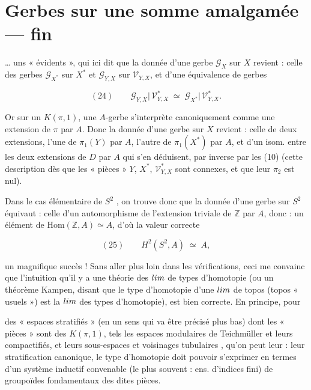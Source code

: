 \documentclass[11pt,a4paper]{article}
\begin{document}
\section*{Gerbes sur une somme amalgamée — fin}

… uns « évidents », qui ici dit que la donnée d'une gerbe $\mathcal{G}_X$
sur $X$ revient : celle des gerbes $\mathcal{G}_{X^{*}}$ sur $X^{*}$ et
$\mathcal{G}_{Y,X}$ sur $\mathcal{V}_{Y,X}$, et d'une 
équivalence de  gerbes

\[
  (24) \qquad
  \mathcal{G}_{Y,X}\bigl|\,\mathcal{V}^{*}_{Y,X}
  \;\simeq\;
  \mathcal{G}_{X^{*}}\bigl|\,\mathcal{V}^{*}_{Y,X} .
\]

Or sur un $K(\pi,1)$, une $A$-gerbe s'interprète canoniquement comme une
extension de $\pi$ par $A$. Donc la donnée d'une gerbe sur $X$
 revient : celle  de deux extensions, l'une de
$\pi_1(Y)$ par $A$, l'autre de $\pi_1(X^{*})$ par $A$, et d'un isom. entre les
deux extensions de $D$ par $A$ qui s'en déduisent, par  inverse par les  (10)
(cette description  dès que les « pièces » $Y$, $X^{*}$, $\mathcal{V}^{*}_{Y,X}$ sont
connexes, et que leur $\pi_2$ est nul).


Dans le cas élémentaire de $S^{2}$ , on trouve donc que la donnée
d'une gerbe sur $S^{2}$ équivaut : celle d'un automorphisme de l'extension
triviale de $\mathbb{Z}$ par $A$, donc : un élément de
$\mathrm{Hom}(\mathbb{Z}, A) \simeq A$, d'où la valeur correcte

\[
  (25) \qquad H^{2}(S^{2}, A) \;\simeq\; A ,
\]

un magnifique succès ! Sans aller plus loin dans  les
vérifications, ceci me convainc que l'intuition qu'il y a une théorie des
 $\varinjlim$ de types d'homotopie (ou un
théorème  Kampen, disant que le type d'homotopie d'une
$\varinjlim$ de topos (topos « usuels ») est la $\varinjlim$ des types
d'homotopie), est bien correcte. En principe, pour

des « espaces stratifiés » (en un sens qui va être précisé plus bas) dont les
« pièces » sont des $K(\pi,1)$, tels les espaces modulaires de Teichmüller et
leurs compactifiés, et leurs sous-espaces et voisinages tubulaires \ill,
qu'on peut leur   : leur stratification
canonique, le type d'homotopie doit pouvoir s'exprimer en termes d'un système
inductif convenable (le plus souvent : ens. d'indices fini) de groupoïdes
fondamentaux des dites pièces.
\end{document}
